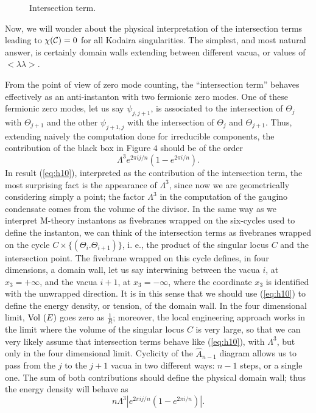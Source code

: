 

\begin{figure}[ht]
\def\epsfsize#1#2{.6#1}
\centerline{}
\caption{Intersection term.}
\end{figure}

  

Now, we will wonder about the physical interpretation of the
intersection terms leading to $\chi({\cal C})=0$ for all Kodaira
singularities. The simplest, and most natural answer, is
certainly domain walls extending between different vacua, or
values of $<\lambda \lambda>$.

  
From the point of view of zero mode counting, the ``intersection
term'' behaves effectively as an anti-instanton with two
fermionic zero modes. One of these fermionic zero modes, let us
say $\psi_{j,j+1}$, is associated to the intersection of
$\Theta_{j}$ with $\Theta_{j+1}$ and the other $\psi_{j+1,j}$
with the intersection of $\Theta_{j}$ and $\Theta_{j+1}$. Thus, extending naively the 
computation done for irreducible components, the contribution of
the black box in Figure $4$ should be of the order
\begin{equation}
\Lambda^3 e^{2 \pi ij/n} (1-e^{2 \pi i/n}).
\label{eq:h10}
\end{equation}
In result (\ref{eq:h10}), interpreted as the contribution of the
intersection term, the most surprising fact is the appearance of
$\Lambda^3$, since now we are geometrically considering simply a
point; the factor $\Lambda^3$ in the computation of the gaugino
condensate comes from the volume of the divisor. In the same way
as we interpret M-theory instantons as fivebranes wrapped on the
six-cycles used to define the instanton, we can think of the
intersection terms as fivebranes wrapped on the cycle $C \times
\{(\Theta_i . \Theta_{i+1})\}$, i. e., the product of the singular
locus $C$ and the intersection point. The fivebrane wrapped on
this cycle defines, in four dimensions, a domain wall, let us say
interwining between the vacua $i$, at $x_3=+ \infty$, and the
vacua $i+1$, at $x_3=- \infty$, where the coordinate $x_3$ is
identified with the unwrapped direction. It is in this sense that
we should use (\ref{eq:h10}) to define the energy density, or
tension, of the domain wall. In the four dimensional limit,
$\hbox {Vol }(E)$ goes zero as $\frac {1}{R}$; moreover, the
local engineering approach works in the limit where the volume of
the singular locus $C$ is very large, so that we can very likely
assume that intersection terms behave like (\ref{eq:h10}), with
$\Lambda^3$, but only in the four dimensional limit. Cyclicity of
the $\hat{A}_{n-1}$ diagram allows us to pass from the $j$ to the
$j+1$ vacua in two different ways: $n-1$ steps, or a single one.
The sum of both contributions should define the physical domain
wall; thus the energy density will behave as
\begin{equation}
n \Lambda^3 |e^{2 \pi ij/n} (1-e^{2 \pi i/n})|.
\label{eq:h11}
\end{equation}
  
